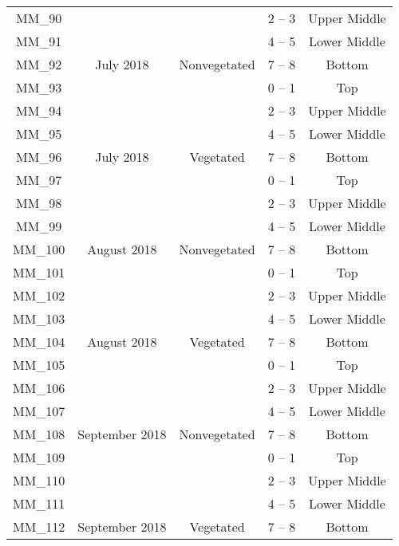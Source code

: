 \documentclass[
  12 pt,
]{article}
\begin{document}
\begin{singlespace}
\begin{longtable}[t]{ccccc}
\nopagebreak
MM\_90 &  &  & 2 – 3 & Upper Middle\\
\nopagebreak
MM\_91 &  &  & 4 – 5 & Lower Middle\\
\nopagebreak
MM\_92 & \multirow{-4}{*}{\centering\arraybackslash 9 July 2018} & \multirow{-4}{*}{\centering\arraybackslash Nonvegetated} & 7 – 8 & Bottom\\
\cmidrule{1-5}\pagebreak[0]
MM\_93 &  &  & 0 – 1 & Top\\
\nopagebreak
MM\_94 &  &  & 2 – 3 & Upper Middle\\
\nopagebreak
MM\_95 &  &  & 4 – 5 & Lower Middle\\
\nopagebreak
MM\_96 & \multirow{-4}{*}{\centering\arraybackslash 9 July 2018} & \multirow{-4}{*}{\centering\arraybackslash Vegetated} & 7 – 8 & Bottom\\
\cmidrule{1-5}\pagebreak[0]
MM\_97 &  &  & 0 – 1 & Top\\
\nopagebreak
MM\_98 &  &  & 2 – 3 & Upper Middle\\
\nopagebreak
MM\_99 &  &  & 4 – 5 & Lower Middle\\
\nopagebreak
MM\_100 & \multirow{-4}{*}{\centering\arraybackslash 8 August 2018} & \multirow{-4}{*}{\centering\arraybackslash Nonvegetated} & 7 – 8 & Bottom\\
\cmidrule{1-5}\pagebreak[0]
MM\_101 &  &  & 0 – 1 & Top\\
\nopagebreak
MM\_102 &  &  & 2 – 3 & Upper Middle\\
\nopagebreak
MM\_103 &  &  & 4 – 5 & Lower Middle\\
\nopagebreak
MM\_104 & \multirow{-4}{*}{\centering\arraybackslash 8 August 2018} & \multirow{-4}{*}{\centering\arraybackslash Vegetated} & 7 – 8 & Bottom\\
\cmidrule{1-5}\pagebreak[0]
MM\_105 &  &  & 0 – 1 & Top\\
\nopagebreak
MM\_106 &  &  & 2 – 3 & Upper Middle\\
\nopagebreak
MM\_107 &  &  & 4 – 5 & Lower Middle\\
\nopagebreak
MM\_108 & \multirow{-4}{*}{\centering\arraybackslash 3 September 2018} & \multirow{-4}{*}{\centering\arraybackslash Nonvegetated} & 7 – 8 & Bottom\\
\cmidrule{1-5}\pagebreak[0]
MM\_109 &  &  & 0 – 1 & Top\\
\nopagebreak
MM\_110 &  &  & 2 – 3 & Upper Middle\\
\nopagebreak
MM\_111 &  &  & 4 – 5 & Lower Middle\\
\nopagebreak
MM\_112 & \multirow{-4}{*}{\centering\arraybackslash 3 September 2018} & \multirow{-4}{*}{\centering\arraybackslash Vegetated} & 7 – 8 & Bottom\\

\end{longtable}
\end{singlespace}
\end{document}
